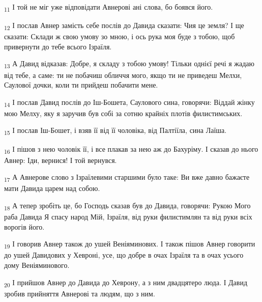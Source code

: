 \begin{tcolorbox}
\textsubscript{11} І той не міг уже відповідати Авнерові ані слова, бо боявся його.
\end{tcolorbox}
\begin{tcolorbox}
\textsubscript{12} І послав Авнер замість себе послів до Давида сказати: Чия це земля? І ще сказати: Склади ж свою умову зо мною, і ось рука моя буде з тобою, щоб привернути до тебе всього Ізраїля.
\end{tcolorbox}
\begin{tcolorbox}
\textsubscript{13} А Давид відказав: Добре, я складу з тобою умову! Тільки однієї речі я жадаю від тебе, а саме: ти не побачиш обличчя мого, якщо ти не приведеш Мелхи, Саулової дочки, коли ти прийдеш побачити мене.
\end{tcolorbox}
\begin{tcolorbox}
\textsubscript{14} І послав Давид послів до Іш-Бошета, Саулового сина, говорячи: Віддай жінку мою Мелху, яку я заручив був собі за сотню крайніх плотів филистимських.
\end{tcolorbox}
\begin{tcolorbox}
\textsubscript{15} І послав Іш-Бошет, і взяв її від її чоловіка, від Палтіїла, сина Лаїша.
\end{tcolorbox}
\begin{tcolorbox}
\textsubscript{16} І пішов з нею чоловік її, і все плакав за нею аж до Бахуріму. І сказав до нього Авнер: Іди, вернися! І той вернувся.
\end{tcolorbox}
\begin{tcolorbox}
\textsubscript{17} А Авнерове слово з Ізраїлевими старшими було таке: Ви вже давно бажаєте мати Давида царем над собою.
\end{tcolorbox}
\begin{tcolorbox}
\textsubscript{18} А тепер зробіть це, бо Господь сказав був до Давида, говорячи: Рукою Мого раба Давида Я спасу народ Мій, Ізраїля, від руки филистимлян та від руки всіх ворогів його.
\end{tcolorbox}
\begin{tcolorbox}
\textsubscript{19} І говорив Авнер також до ушей Веніяминових. І також пішов Авнер говорити до ушей Давидових у Хевроні, усе, що добре в очах Ізраїля та в очах усього дому Веніяминового.
\end{tcolorbox}
\begin{tcolorbox}
\textsubscript{20} І прийшов Авнер до Давида до Хеврону, а з ним двадцятеро люда. І Давид зробив прийняття Авнерові та людям, що з ним.
\end{tcolorbox}
